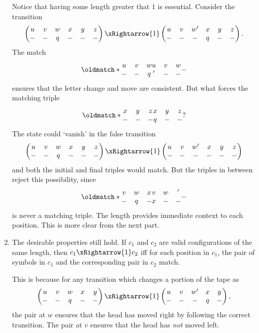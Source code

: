 \documentclass[12pt]{article}
\def\match{\oldmatch*}
\newcommand{\triple}[6]{%
    \begin{matrix}
        #1 & #2 & #3 \\
        #4 & #5 & #6 \\
    \end{matrix}%
}
\begin{document}
\begin{solution}
\begin{enumerate}[label=(\alph*)]
        Notice that having some length greater that $1$ is essential.
        Consider the transition \[
            \begin{pmatrix}
                u & v & w & x & y & z \\
                - & - & q & - & - & -
            \end{pmatrix} \xRightarrow{1} \begin{pmatrix}
                u & v & w' & x & y & z \\
                - & - & -  & q & - & -
            \end{pmatrix}.
        \] The match \[
            \match{\triple u v w --q}{\triple u v w' ---}
        \] ensures that the letter change and move are consistent.
        But what forces the matching triple \[
            \match{\triple x y z ---}{\triple x y z q--}?
        \] The state could `vanish' in the false transition \[
            \begin{pmatrix}
                u & v & w & x & y & z \\
                - & - & q & - & - & -
            \end{pmatrix} \xRightarrow{1} \begin{pmatrix}
                u & v & w' & x & y & z \\
                - & - & -  & - & - & -
            \end{pmatrix}
        \] and both the initial and final triples would match.
        But the triples in between reject this possibility, since
        \[
            \match{\triple v w x -q-}{\triple v w' x ---}
        \] is never a matching triple.
        The length provides immediate context to each position.
        This is more clear from the next part.
        \item The desirable properties still hold.
        If $c_1$ and $c_2$ are valid configurations of the same length,
        then $c_1 \xRightarrow{1} c_2$ iff for each position in $c_1$,
        the pair of symbols in $c_1$ and the corresponding pair in $c_2$
        match.

        This is because for any transition which changes a portion of the
        tape as \[
            \begin{pmatrix}
                u & v & w & x & y \\
                - & - & q & - & -
            \end{pmatrix} \xRightarrow{1} \begin{pmatrix}
                u & v & w' & x & y \\
                - & - & -  & q & -
            \end{pmatrix},
        \] the pair at $w$ ensures that the head has moved right by
        following the correct transition.
        The pair at $v$ ensures that the head has \emph{not} moved left.
        \qedhere
    \end{enumerate}
\end{solution}
\end{document}
